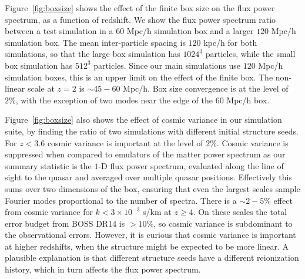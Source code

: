 \documentclass[a4paper,11pt]{article}
\newcommand{\Lya}{Lyman-$\alpha$}
\begin{document}
Figure~\ref{fig:boxsize} shows the effect of the finite box size on the flux power spectrum, as a function of redshift. We show the flux power spectrum ratio between a test simulation in a $60$ Mpc/h simulation box and a larger $120$ Mpc/h simulation box. The mean inter-particle spacing is $120$ kpc/h for both simulations, so that the large box simulation has $1024^3$ particles, while the small box simulation has $512^3$ particles. Since our main simulations use $120$ Mpc/h simulation boxes, this is an upper limit on the effect of the finite box. The non-linear scale at $z=2$ is $\sim 45 - 60$ Mpc/h. Box size convergence is at the level of $2\%$, with the exception of two modes near the edge of the $60$ Mpc/h box.

Figure~\ref{fig:boxsize} also shows the effect of cosmic variance in our simulation suite, by finding the ratio of two simulations with different initial structure seeds. For $z < 3.6$ cosmic variance is important at the level of $2\%$. Cosmic variance is suppressed when compared to emulators of the matter power spectrum as our summary statistic is the $1$-D flux power spectrum, evaluated along the line of sight to the quasar and averaged over multiple quasar positions. Effectively this sums over two dimensions of the box, ensuring that even the largest scales sample Fourier modes proportional to the number of spectra. There is a $\sim 2-5\%$ effect from cosmic variance for $k < 3 \times 10^{-3}$ s/km at $z \geq 4$. On these scales the total error budget from BOSS DR14 is $> 10\%$, so cosmic variance is subdominant to the observational errors. However, it is curious that cosmic variance is important at higher redshifts, when the structure might be expected to be more linear. A plausible explanation is that different structure seeds have a different reionization history, which in turn affects the flux power spectrum.
\end{document}
